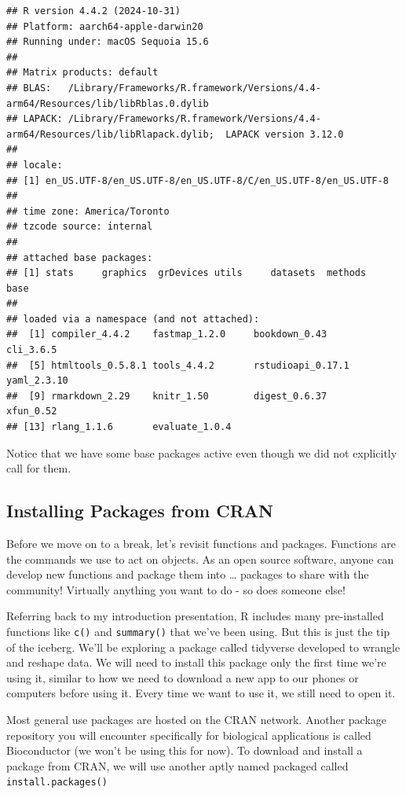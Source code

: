 \documentclass[
]{book}
\begin{document}
\begin{verbatim}
## R version 4.4.2 (2024-10-31)
## Platform: aarch64-apple-darwin20
## Running under: macOS Sequoia 15.6
## 
## Matrix products: default
## BLAS:   /Library/Frameworks/R.framework/Versions/4.4-arm64/Resources/lib/libRblas.0.dylib 
## LAPACK: /Library/Frameworks/R.framework/Versions/4.4-arm64/Resources/lib/libRlapack.dylib;  LAPACK version 3.12.0
## 
## locale:
## [1] en_US.UTF-8/en_US.UTF-8/en_US.UTF-8/C/en_US.UTF-8/en_US.UTF-8
## 
## time zone: America/Toronto
## tzcode source: internal
## 
## attached base packages:
## [1] stats     graphics  grDevices utils     datasets  methods   base     
## 
## loaded via a namespace (and not attached):
##  [1] compiler_4.4.2    fastmap_1.2.0     bookdown_0.43     cli_3.6.5        
##  [5] htmltools_0.5.8.1 tools_4.4.2       rstudioapi_0.17.1 yaml_2.3.10      
##  [9] rmarkdown_2.29    knitr_1.50        digest_0.6.37     xfun_0.52        
## [13] rlang_1.1.6       evaluate_1.0.4
\end{verbatim}

Notice that we have some base packages active even though we did not explicitly call for them.

\subsection{Installing Packages from CRAN}\label{installing-packages-from-cran}

Before we move on to a break, let's revisit functions and packages. Functions are the commands we use to act on objects. As an open source software, anyone can develop new functions and package them into \ldots{} packages to share with the community! Virtually anything you want to do - so does someone else!

Referring back to my introduction presentation, R includes many pre-installed functions like \texttt{c()} and \texttt{summary()} that we've been using. But this is just the tip of the iceberg. We'll be exploring a package called tidyverse developed to wrangle and reshape data. We will need to install this package only the first time we're using it, similar to how we need to download a new app to our phones or computers before using it. Every time we want to use it, we still need to open it.

Most general use packages are hosted on the CRAN network. Another package repository you will encounter specifically for biological applications is called Bioconductor (we won't be using this for now). To download and install a package from CRAN, we will use another aptly named packaged called \texttt{install.packages()}
\end{document}
